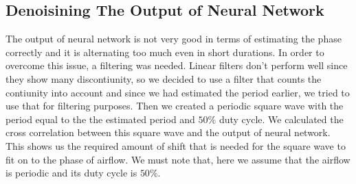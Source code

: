 \subsection{Denoisining The Output of Neural Network}
The output of neural network is not very good in terms of estimating the phase correctly and it is alternating too much even in short durations. In order to overcome this issue, a filtering was needed. Linear filters don't perform well since they show many discontiunity, so we decided to use a filter that counts the contiunity into account and since we had estimated the period earlier, we tried to use that for filtering purposes. Then we created a periodic square wave with the period equal to the the estimated period and $50\%$ duty cycle. We calculated the cross correlation between this square wave and the output of neural network. This shows us the required amount of shift that is needed for the square wave to fit on to the phase of airflow. We must note that, here we assume that the airflow is periodic and its duty cycle is $50\%$. 